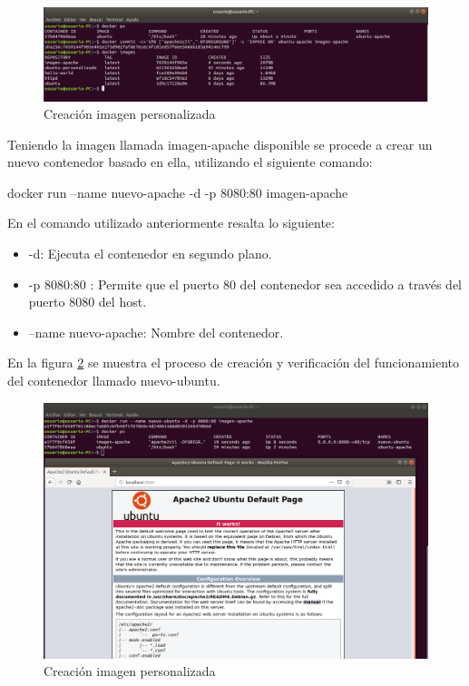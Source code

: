 \begin{figure}[!hbtp]
	\centering
	\includegraphics[width=\linewidth]{Trabajo/RecursosEducativos/RE05_Docker/Caso_resuelto/REDocker_Caso1.png}
	\vspace{-0.2cm}
	\caption{Creación imagen personalizada}
	\label{fig:DockerCaso1}
\end{figure}

Teniendo la imagen llamada imagen-apache disponible se procede a crear un nuevo contenedor basado en ella, utilizando el siguiente comando:

\begin{commandshell}
docker run --name nuevo-apache -d -p 8080:80 imagen-apache
\end{commandshell}

En el comando utilizado anteriormente resalta lo siguiente:
\begin{itemize}
    \item -d: Ejecuta el contenedor en segundo plano.
    \item -p 8080:80 : Permite que el puerto 80 del contenedor sea accedido a través del puerto 8080 del host.
    \item --name nuevo-apache: Nombre del contenedor.
\end{itemize}

En la figura \ref{fig:DockerCaso2} se muestra el proceso de creación y verificación del funcionamiento del contenedor llamado nuevo-ubuntu.

\begin{figure}[!hbtp]
	\centering
	\includegraphics[width=\linewidth]{Trabajo/RecursosEducativos/RE05_Docker/Caso_resuelto/REDocker_Caso2.png}
	\vspace{-0.2cm}
	\caption{Creación imagen personalizada}
	\label{fig:DockerCaso2}
\end{figure}